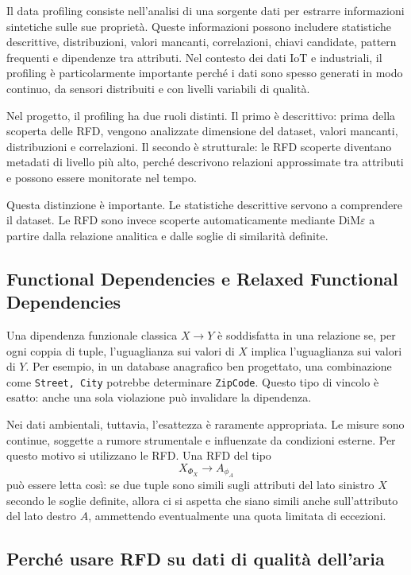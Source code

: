 \documentclass[a4paper,12pt]{article}
\newcommand{\Dime}{DiM\ensuremath{\varepsilon}}
\begin{document}
Il data profiling consiste nell'analisi di una sorgente dati per estrarre informazioni sintetiche sulle sue proprietà. Queste informazioni possono includere statistiche descrittive, distribuzioni, valori mancanti, correlazioni, chiavi candidate, pattern frequenti e dipendenze tra attributi. Nel contesto dei dati IoT e industriali, il profiling è particolarmente importante perché i dati sono spesso generati in modo continuo, da sensori distribuiti e con livelli variabili di qualità.

Nel progetto, il profiling ha due ruoli distinti. Il primo è descrittivo: prima della scoperta delle RFD, vengono analizzate dimensione del dataset, valori mancanti, distribuzioni e correlazioni. Il secondo è strutturale: le RFD scoperte diventano metadati di livello più alto, perché descrivono relazioni approssimate tra attributi e possono essere monitorate nel tempo.

Questa distinzione è importante. Le statistiche descrittive servono a comprendere il dataset. Le RFD sono invece scoperte automaticamente mediante \Dime{} a partire dalla relazione analitica e dalle soglie di similarità definite.

\subsection{Functional Dependencies e Relaxed Functional Dependencies}

Una dipendenza funzionale classica $X \rightarrow Y$ è soddisfatta in una relazione se, per ogni coppia di tuple, l'uguaglianza sui valori di $X$ implica l'uguaglianza sui valori di $Y$. Per esempio, in un database anagrafico ben progettato, una combinazione come \texttt{Street, City} potrebbe determinare \texttt{ZipCode}. Questo tipo di vincolo è esatto: anche una sola violazione può invalidare la dipendenza.

Nei dati ambientali, tuttavia, l'esattezza è raramente appropriata. Le misure sono continue, soggette a rumore strumentale e influenzate da condizioni esterne. Per questo motivo si utilizzano le RFD. Una RFD del tipo
\[
X_{\Phi_X} \rightarrow A_{\phi_A}
\]
può essere letta così: se due tuple sono simili sugli attributi del lato sinistro $X$ secondo le soglie definite, allora ci si aspetta che siano simili anche sull'attributo del lato destro $A$, ammettendo eventualmente una quota limitata di eccezioni.

\subsection{Perché usare RFD su dati di qualità dell'aria}
\end{document}
